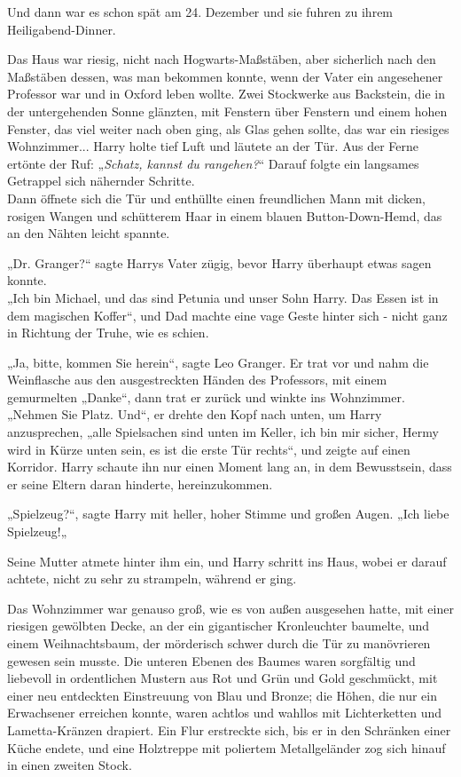{Und dann war es schon spät am 24. Dezember und sie fuhren zu ihrem Heiligabend-Dinner.

Das Haus war riesig, nicht nach Hogwarts-Maßstäben, aber sicherlich nach den Maßstäben dessen, was man bekommen konnte, wenn der Vater ein angesehener Professor war und in Oxford leben wollte. Zwei Stockwerke aus Backstein, die in der untergehenden Sonne glänzten, mit Fenstern über Fenstern und einem hohen Fenster, das viel weiter nach oben ging, als Glas gehen sollte, das war ein riesiges Wohnzimmer... Harry holte tief Luft und läutete an der Tür. Aus der Ferne ertönte der Ruf: „\emph{Schatz, kannst du rangehen?}“ Darauf folgte ein langsames Getrappel sich nähernder Schritte.\\ Dann öffnete sich die Tür und enthüllte einen freundlichen Mann mit dicken, rosigen Wangen und schütterem Haar in einem blauen Button-Down-Hemd, das an den Nähten leicht spannte.

„Dr. Granger?“ sagte Harrys Vater zügig, bevor Harry überhaupt etwas sagen konnte.\\ „Ich bin Michael, und das sind Petunia und unser Sohn Harry. Das Essen ist in dem magischen Koffer“, und Dad machte eine vage Geste hinter sich - nicht ganz in Richtung der Truhe, wie es schien.

„Ja, bitte, kommen Sie herein“, sagte Leo Granger. Er trat vor und nahm die Weinflasche aus den ausgestreckten Händen des Professors, mit einem gemurmelten „Danke“, dann trat er zurück und winkte ins Wohnzimmer. „Nehmen Sie Platz. Und“, er drehte den Kopf nach unten, um Harry anzusprechen, „alle Spielsachen sind unten im Keller, ich bin mir sicher, Hermy wird in Kürze unten sein, es ist die erste Tür rechts“, und zeigte auf einen Korridor. Harry schaute ihn nur einen Moment lang an, in dem Bewusstsein, dass er seine Eltern daran hinderte, hereinzukommen.

„Spielzeug?“, sagte Harry mit heller, hoher Stimme und großen Augen. „Ich liebe Spielzeug!„

Seine Mutter atmete hinter ihm ein, und Harry schritt ins Haus, wobei er darauf achtete, nicht zu sehr zu strampeln, während er ging.

Das Wohnzimmer war genauso groß, wie es von außen ausgesehen hatte, mit einer riesigen gewölbten Decke, an der ein gigantischer Kronleuchter baumelte, und einem Weihnachtsbaum, der mörderisch schwer durch die Tür zu manövrieren gewesen sein musste. Die unteren Ebenen des Baumes waren sorgfältig und liebevoll in ordentlichen Mustern aus Rot und Grün und Gold geschmückt, mit einer neu entdeckten Einstreuung von Blau und Bronze; die Höhen, die nur ein Erwachsener erreichen konnte, waren achtlos und wahllos mit Lichterketten und Lametta-Kränzen drapiert. Ein Flur erstreckte sich, bis er in den Schränken einer Küche endete, und eine Holztreppe mit poliertem Metallgeländer zog sich hinauf in einen zweiten Stock.

}
